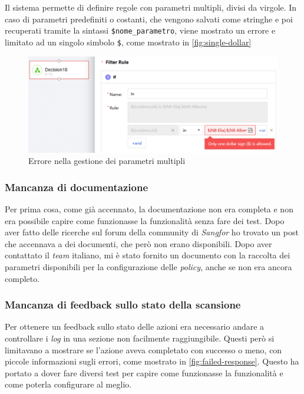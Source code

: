 Il sistema permette di definire regole con parametri multipli, divisi da virgole. In caso di parametri predefiniti o costanti, che vengono salvati come stringhe e poi recuperati tramite la sintassi \texttt{\$nome\_parametro}, viene mostrato un errore e limitato ad un singolo simbolo \texttt{\$}, come mostrato in \autoref{fig:single-dollar}

\begin{figure}[!htbp]
    \centering
    \includegraphics[width=0.9\linewidth]{images/ndr/single-dollar.png}
    \caption{Errore nella gestione dei parametri multipli}
    \label{fig:single-dollar}
\end{figure}

\subsubsection{Mancanza di documentazione}

Per prima cosa, come già accennato, la documentazione non era completa e non era possibile capire come funzionasse la funzionalità senza fare dei test. Dopo aver fatto delle ricerche sul forum della community\cite{forum:sangfor-community} di \emph{Sangfor} ho trovato un post che accennava a dei documenti, che però non erano disponibili. Dopo aver contattato il \emph{team} italiano, mi è stato fornito un documento con la raccolta dei parametri disponibili per la configurazione delle \emph{policy}, anche se non era ancora completo\cite{sangfor:policy-parameter}.

\subsubsection{Mancanza di feedback sullo stato della scansione}

Per ottenere un feedback sullo stato delle azioni era necessario andare a controllare i \emph{log} in una sezione non facilmente raggiungibile. Questi però si limitavano a mostrare se l'azione aveva completato con successo o meno, con piccole informazioni sugli errori, come mostrato in \autoref{fig:failed-response}. Questo ha portato a dover fare diversi test per capire come funzionasse la funzionalità e come poterla configurare al meglio.

